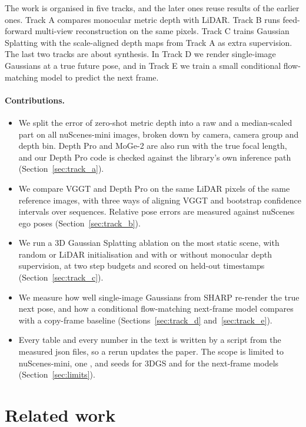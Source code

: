 \documentclass[10pt]{article}
\newcommand{\gpu}{\GPUname}
\begin{document}
The work is organised in five tracks, and the later ones reuse results of the earlier ones. Track A
compares monocular metric depth with LiDAR. Track B runs feed-forward multi-view reconstruction on the same
pixels. Track C trains Gaussian Splatting with the scale-aligned depth maps from Track A as extra
supervision. The last two tracks are about synthesis. In Track D we render single-image Gaussians at a true
future pose, and in Track E we train a small conditional flow-matching model to predict the next frame.

\paragraph{Contributions.}
\begin{itemize}
  \item We split the error of zero-shot metric depth into a raw and a median-scaled part on all \DPimages{}
        nuScenes-mini images, broken down by camera, camera group and depth bin. Depth Pro and MoGe-2 are
        also run with the true focal length, and our Depth Pro code is checked against the library's own
        inference path (Section~\ref{sec:track_a}).
  \item We compare VGGT and Depth Pro on the same LiDAR pixels of the same reference images, with three
        ways of aligning VGGT and bootstrap confidence intervals over sequences. Relative pose errors are
        measured against nuScenes ego poses (Section~\ref{sec:track_b}).
  \item We run a 3D Gaussian Splatting ablation on the most static scene, with random or LiDAR
        initialisation and with or without monocular depth supervision, at two step budgets and scored on
        held-out timestamps (Section~\ref{sec:track_c}).
  \item We measure how well single-image Gaussians from SHARP re-render the true next pose, and how a
        conditional flow-matching next-frame model compares with a copy-frame baseline
        (Sections~\ref{sec:track_d} and~\ref{sec:track_e}).
  \item Every table and every number in the text is written by a script from the measured json files, so
        a rerun updates the paper. The scope is limited to nuScenes-mini, one \gpu{}, and \GSnSeeds{} seeds
        for 3DGS and \NFnSeeds{} for the next-frame models (Section~\ref{sec:limits}).
\end{itemize}

\section{Related work}
\label{sec:related}
\end{document}
